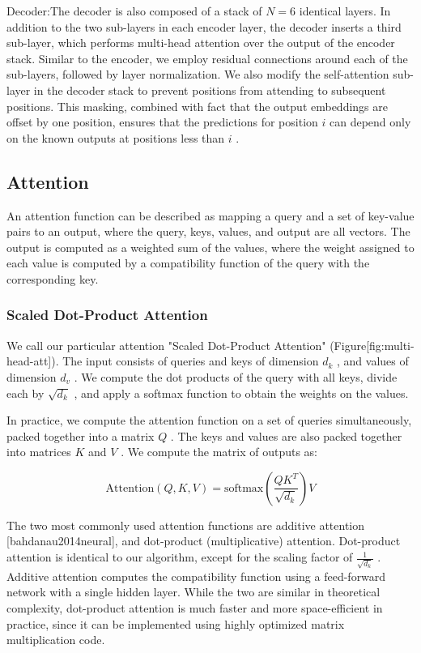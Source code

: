 \documentclass[11pt,a4paper]{article}
\begin{document}
Decoder:The decoder is also composed of a stack of  $N=6$  identical layers.  In addition to the two sub-layers in each encoder layer, the decoder inserts a third sub-layer, which performs multi-head attention over the output of the encoder stack.  Similar to the encoder, we employ residual connections around each of the sub-layers, followed by layer normalization.  We also modify the self-attention sub-layer in the decoder stack to prevent positions from attending to subsequent positions.  This masking, combined with fact that the output embeddings are offset by one position, ensures that the predictions for position  $i$  can depend only on the known outputs at positions less than  $i$ .

\subsection{Attention}

An attention function can be described as mapping a query and a set of key-value pairs to an output, where the query, keys, values, and output are all vectors.  The output is computed as a weighted sum of the values, where the weight assigned to each value is computed by a compatibility function of the query with the corresponding key.

\subsubsection{Scaled Dot-Product Attention}

We call our particular attention "Scaled Dot-Product Attention" (Figure[fig:multi-head-att]).   The input consists of queries and keys of dimension  $d_k$ , and values of dimension  $d_v$ .  We compute the dot products of the query with all keys, divide each by  $\sqrt{d_k}$ , and apply a softmax function to obtain the weights on the values.

In practice, we compute the attention function on a set of queries simultaneously, packed together into a matrix  $Q$ .   The keys and values are also packed together into matrices  $K$  and  $V$ .  We compute the matrix of outputs as:

$$\begin{equation}
   \mathrm{Attention}(Q, K, V) = \mathrm{softmax}(\frac{QK^T}{\sqrt{d_k}})V
\end{equation}$$

The two most commonly used attention functions are additive attention [bahdanau2014neural], and dot-product (multiplicative) attention.  Dot-product attention is identical to our algorithm, except for the scaling factor of  $\frac{1}{\sqrt{d_k}}$ . Additive attention computes the compatibility function using a feed-forward network with a single hidden layer.  While the two are similar in theoretical complexity, dot-product attention is much faster and more space-efficient in practice, since it can be implemented using highly optimized matrix multiplication code.
\end{document}
